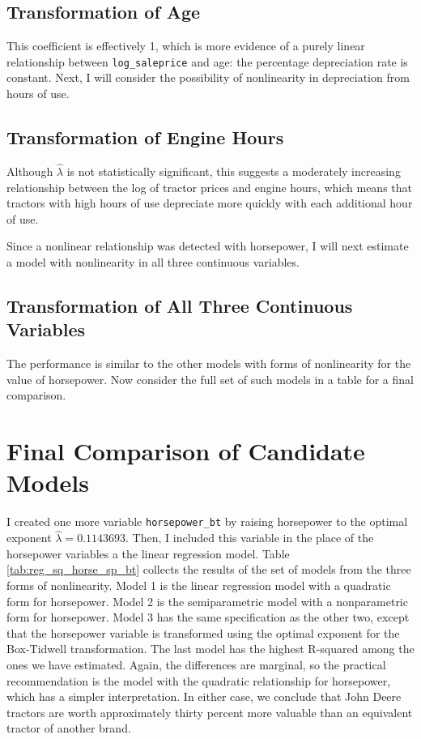 \subsection{Transformation of Age}




This coefficient is effectively 1, which is more evidence of
a purely linear relationship between \texttt{log\_saleprice}
and age: the percentage depreciation rate is constant.
Next, I will consider the possibility of nonlinearity 
in depreciation from hours of use. 

\subsection{Transformation of Engine Hours}




Although $\hat{\lambda}$ is not statistically significant,
this suggests a moderately increasing relationship
between the log of tractor prices and engine hours,
which means that tractors with high hours of use
depreciate more quickly with each additional hour of use.

Since a nonlinear relationship was detected with horsepower,
I will next estimate a model
with nonlinearity in all three continuous variables.


\subsection{Transformation of All Three Continuous Variables}





The performance is similar to the other models with
forms of nonlinearity for the value of horsepower.
Now consider the full set of such models in a table for a final comparison.


\pagebreak
\section{Final Comparison of Candidate Models}

I created one more variable \texttt{horsepower\_bt}
by raising horsepower to the optimal exponent 
$\hat{\lambda} = 0.1143693$. 
Then, I included this variable in the place of 
the horsepower variables a the linear regression model.
% 
Table \ref{tab:reg_sq_horse_sp_bt} collects the results
of the set of models from the three forms of nonlinearity.
Model 1 is the linear regression model with 
a quadratic form for horsepower. 
Model 2 is the semiparametric model with
a nonparametric form for horsepower. 
Model 3 has the same specification as the other two, 
except that the horsepower variable is transformed using the optimal
exponent for the Box-Tidwell transformation. 
% 
The last model has the highest R-squared
among the ones we have estimated.
Again, the differences are marginal, so the practical recommendation
is the model with the quadratic relationship for horsepower, 
which has a simpler interpretation.
In either case, we conclude that John Deere tractors are worth
approximately thirty percent more valuable
than an equivalent tractor of another brand. 





% 

